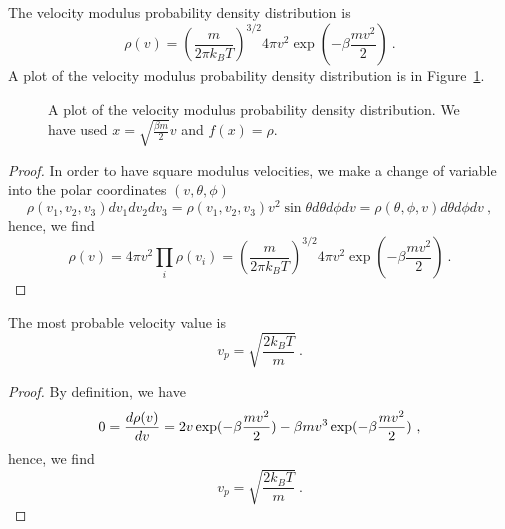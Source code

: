     The velocity modulus probability density distribution is 
    \begin{equation*}
        \rho (v) = (\frac{m}{2\pi k_B T})^{3/2} 4 \pi v^2 \exp(- \beta \frac{m v^2}{2}) ~.
    \end{equation*}
    A plot of the velocity modulus probability density distribution is in Figure~\ref{fig:mb:vel}.
    \begin{figure}
        \centering
        \caption{A plot of the velocity modulus probability density distribution. We have used $x = \sqrt{\frac{\beta m}{2}} v$ and $f(x) = \rho$.}
        \label{fig:mb:vel}
    \end{figure}
    \begin{proof}
        In order to have square modulus velocities, we make a change of variable into the polar coordinates $(v, \theta, \phi)$
        \begin{equation*}
            \rho(v_1, v_2, v_3) dv_1 dv_2 dv_3 = \rho(v_1, v_2, v_3) v^2 \sin \theta d\theta d\phi dv = \rho(\theta, \phi, v) d\theta d\phi dv ~,
        \end{equation*}
        hence, we find
        \begin{equation*}
            \rho(v) = 4 \pi v^2 \prod_i \rho (v_i) = (\frac{m}{2\pi k_B T})^{3/2} 4 \pi v^2 \exp(- \beta \frac{m v^2}{2})  ~.
        \end{equation*}
    \end{proof}
    
    The most probable velocity value is 
    \begin{equation*}
        v_p = \sqrt{\frac{2 k_B T}{m}} ~.
    \end{equation*}
    \begin{proof}
        By definition, we have
        \begin{equation*}
            0 = \frac{d\rho(v)}{dv} = 2 v \exp(- \beta \frac{m v^2}{2}) - \beta m v^3 \exp(- \beta \frac{m v^2}{2}) ~,
        \end{equation*}
        hence, we find
        \begin{equation*}
            v_p = \sqrt{\frac{2k_B T}{m}} ~.
        \end{equation*}
    \end{proof}

